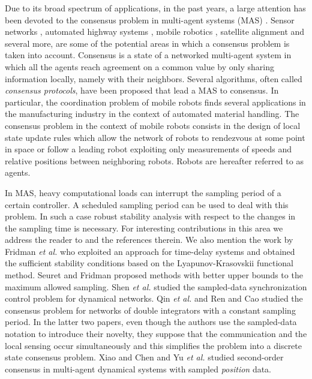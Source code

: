 \documentclass[conference]{IEEEtran}
\begin{document}
Due to its broad spectrum of applications, in the past years, a
large attention has been devoted to the consensus problem in multi-agent systems
 (MAS) \cite{qin2011second,ren2005survey,yu2010some,Zareh_consensus2}.
Sensor networks \cite{yu2009distributed,olfati2005consensus}, automated highway systems \cite{ren2005survey},
mobile robotics \cite{khoo2009robust}, satellite alignment \cite{ren2007distributed} and several more,
are some of the potential areas in which a consensus problem is taken into account. Consensus is a state of a networked multi-agent system in which all the agents reach agreement on a common value by only sharing information locally, namely with their neighbors. Several algorithms, often called {\em consensus protocols}, have been proposed that lead a MAS to consensus. In particular, the coordination problem of mobile robots finds several applications in the manufacturing industry in the context of automated material handling. The consensus problem in the context of mobile robots consists in the design of local state update rules which allow the network of robots to rendezvous at some point in space or follow a leading robot exploiting only measurements of speeds and relative positions between neighboring robots. Robots are hereafter referred to as agents.


In MAS, heavy computational loads can interrupt the sampling period of a certain controller. A scheduled sampling period can be used to deal with this problem. In such a case robust stability analysis with respect to the changes in the sampling time is necessary. For interesting contributions in this area we address the reader to \cite{ackermann1985sampled,fridman2010refined,zutshi2012timed} and the references therein. We also mention the work by Fridman {\em et al.} \cite{fridman2004robust} who exploited an approach for time-delay systems and obtained the sufficient stability conditions based on the Lyapunov-Krasovskii functional method. Seuret \cite{seuret2012novel} and Fridman \cite{fridman2010refined} proposed methods with better upper bounds to the maximum allowed sampling. Shen {\em et al.} \cite{shen2012sampled} studied the sampled-data synchronization control problem for dynamical networks. Qin {\em et al.} \cite{qin2010sampled} and Ren and Cao \cite{ren2008convergence} studied the consensus problem for networks of double integrators with a constant sampling period. In the latter two papers, even though the authors use the sampled-data notation to introduce their novelty, they suppose that the communication and the local sensing occur simultaneously and this simplifies the problem into a discrete state consensus problem. Xiao and Chen \cite{xiao2012sampled} and Yu {\em et al.} \cite{yu2011second} studied second-order consensus in multi-agent dynamical systems with sampled \emph{position} data.
\end{document}
